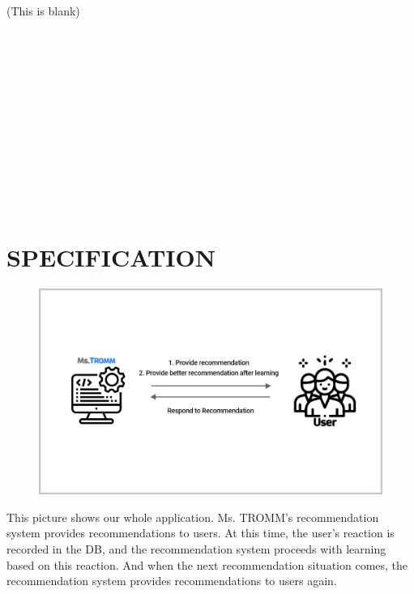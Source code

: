 \documentclass[conference]{IEEEtran}
\begin{document}
\textcolor[rgb]{1,1,1}{(This is blank)} \\ \\ \\ \\ \\ \\ \\ \\ \\ \\ \\ \\ \\ 
\break

\section{SPECIFICATION}
    \begin{figure}[htbp]
\centerline{\includegraphics[scale=0.2]{assets/Whole application.jpg}}
\label{fig}
\end{figure}
This picture shows our whole application. Ms. TROMM's recommendation system provides recommendations to users. At this time, the user's reaction is recorded in the DB, and the recommendation system proceeds with learning based on this reaction. And when the next recommendation situation comes, the recommendation system provides recommendations to users again. \\ 
\end{document}
